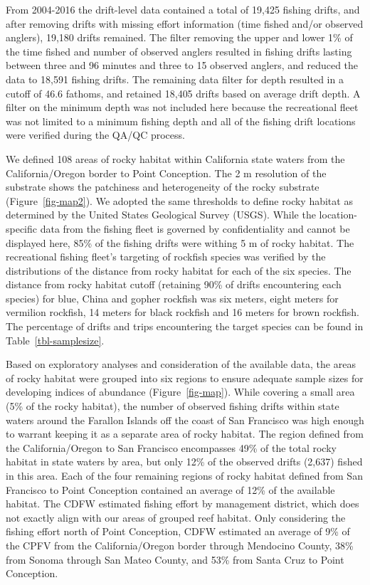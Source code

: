 \documentclass[
  12pt,
  authoryear,
  preprint,
  3p]{elsarticle}
\begin{document}
From 2004-2016 the drift-level data contained a total of 19,425 fishing
drifts, and after removing drifts with missing effort information (time
fished and/or observed anglers), 19,180 drifts remained. The filter
removing the upper and lower 1\% of the time fished and number of
observed anglers resulted in fishing drifts lasting between three and 96
minutes and three to 15 observed anglers, and reduced the data to 18,591
fishing drifts. The remaining data filter for depth resulted in a cutoff
of 46.6 fathoms, and retained 18,405 drifts based on average drift
depth. A filter on the minimum depth was not included here because the
recreational fleet was not limited to a minimum fishing depth and all of
the fishing drift locations were verified during the QA/QC process.

We defined 108 areas of rocky habitat within California state waters
from the California/Oregon border to Point Conception. The 2 m
resolution of the substrate shows the patchiness and heterogeneity of
the rocky substrate (Figure~\ref{fig-map2}). We adopted the same
thresholds to define rocky habitat as determined by the United States
Geological Survey (USGS). While the location-specific data from the
fishing fleet is governed by confidentiality and cannot be displayed
here, 85\% of the fishing drifts were withing 5 m of rocky habitat. The
recreational fishing fleet's targeting of rockfish species was verified
by the distributions of the distance from rocky habitat for each of the
six species. The distance from rocky habitat cutoff (retaining 90\% of
drifts encountering each species) for blue, China and gopher rockfish
was six meters, eight meters for vermilion rockfish, 14 meters for black
rockfish and 16 meters for brown rockfish. The percentage of drifts and
trips encountering the target species can be found in
Table~\ref{tbl-samplesize}.

Based on exploratory analyses and consideration of the available data,
the areas of rocky habitat were grouped into six regions to ensure
adequate sample sizes for developing indices of abundance
(Figure~\ref{fig-map}). While covering a small area (5\% of the rocky
habitat), the number of observed fishing drifts within state waters
around the Farallon Islands off the coast of San Francisco was high
enough to warrant keeping it as a separate area of rocky habitat. The
region defined from the California/Oregon to San Francisco encompasses
49\% of the total rocky habitat in state waters by area, but only 12\%
of the observed drifts (2,637) fished in this area. Each of the four
remaining regions of rocky habitat defined from San Francisco to Point
Conception contained an average of 12\% of the available habitat. The
CDFW estimated fishing effort by management district, which does not
exactly align with our areas of grouped reef habitat. Only considering
the fishing effort north of Point Conception, CDFW estimated an average
of 9\% of the CPFV from the California/Oregon border through Mendocino
County, 38\% from Sonoma through San Mateo County, and 53\% from Santa
Cruz to Point Conception.
\end{document}
